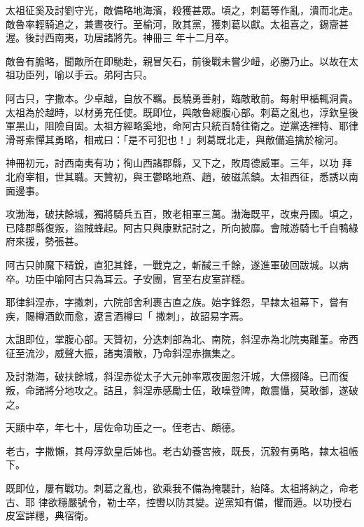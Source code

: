 \begin{pinyinscope}
 太祖征奚及討劉守光，敵備略地海濱，殺獲甚眾。頃之，刺葛等作亂，潰而北走。敵魯率輕騎追之，兼晝夜行。至榆河，敗其黨，獲刺葛以獻。太祖喜之，錫齎甚渥。後討西南夷，功居諸將先。神冊三
 年十二月卒。



 敵魯有膽略，聞敵所在即馳赴，親冒矢石，前後戰未嘗少衄，必勝乃止。以故在太祖功臣列，喻以手云。弟阿古只。



 阿古只，字撒本。少卓越，自放不羈。長驍勇善射，臨敵敢前。每射甲楯輒洞貴。太祖為於越時，以材勇充任使。既即位，與敵魯總腹心部。刺葛之亂也，淳欽皇後軍黑山，阻險自固。太祖方經略奚地，命阿古只統百騎往衛之。逆黨迭裡特、耶律滑哥索憚其勇略，相戒曰：「是不可犯也！」刺葛既北走，與敵備追擒於榆河。



 神冊初元，討西南夷有功；徇山西諸郡縣，又下之，敗周德威軍。三年，以功
 拜北府宰相，世其職。天贊初，與王鬱略地燕、趙，破磁羔鎮。太祖西征，悉誘以南面邊事。



 攻渤海，破扶餘城，獨將騎兵五百，敗老相軍三萬。渤海既平，改東丹國。頃之，已降郡縣復叛，盜賊蜂起。阿古只與康默記討之，所向披靡。會賊游騎七千自鴨綠府來援，勢張甚。



 阿古只帥魔下精銳，直犯其鋒，一戰克之，斬馘三千餘，遂進軍破回跋城。以病卒。功臣中喻阿古只為耳云。子安團，官至右皮室詳穩。



 耶律斜涅赤，字撒刺，六院部舍利裹古直之族。始字鋒怨，早隸太祖幕下，嘗有疾，賜樽酒飲而愈，遼言酒樽曰「
 撒刺」，故詔易字焉。



 太詛即位，掌腹心部。天贊初，分迭刺部為北、南院，斜涅赤為北院夷離堇。帝西征至流沙，威聲大振，諸夷潰散，乃命斜涅赤撫集之。



 及討渤海，破扶餘城，斜涅赤從太子大元帥率眾夜圍忽汗城，大僄掇降。已而復叛，命諸將分地攻之。詰且，斜涅赤感勵士伍，敢噪登陴，敵震懾，莫敢御，遂破之。



 天顯中卒，年七十，居佐命功臣之一。侄老古、頗德。



 老古，字撒懶，其母淳欽皇后姊也。老古幼養宮掖，既長，沉毅有勇略，隸太祖帳下。



 既即位，屢有戰功。刺葛之亂也，欲乘我不備為掩襲計，紿降。太祖將納之，命老古、耶
 律欲穩嚴號令，勒士卒，控轡以防其變。逆黨知有備，懼而遁。以功授右皮室詳穩，典宿衛。




\end{pinyinscope}
